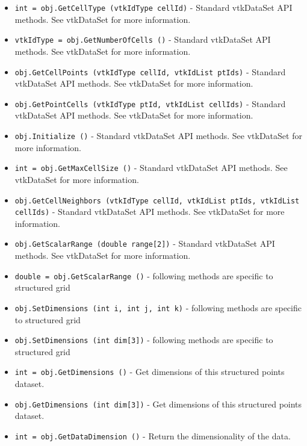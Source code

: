 \begin{itemize}
\item  \verb|int = obj.GetCellType (vtkIdType cellId)| -  Standard vtkDataSet API methods. See vtkDataSet for more information.

\item  \verb|vtkIdType = obj.GetNumberOfCells ()| -  Standard vtkDataSet API methods. See vtkDataSet for more information.

\item  \verb|obj.GetCellPoints (vtkIdType cellId, vtkIdList ptIds)| -  Standard vtkDataSet API methods. See vtkDataSet for more information.

\item  \verb|obj.GetPointCells (vtkIdType ptId, vtkIdList cellIds)| -  Standard vtkDataSet API methods. See vtkDataSet for more information.

\item  \verb|obj.Initialize ()| -  Standard vtkDataSet API methods. See vtkDataSet for more information.

\item  \verb|int = obj.GetMaxCellSize ()| -  Standard vtkDataSet API methods. See vtkDataSet for more information.

\item  \verb|obj.GetCellNeighbors (vtkIdType cellId, vtkIdList ptIds, vtkIdList cellIds)| -  Standard vtkDataSet API methods. See vtkDataSet for more information.

\item  \verb|obj.GetScalarRange (double range[2])| -  Standard vtkDataSet API methods. See vtkDataSet for more information.

\item  \verb|double = obj.GetScalarRange ()| -  following methods are specific to structured grid

\item  \verb|obj.SetDimensions (int i, int j, int k)| -  following methods are specific to structured grid

\item  \verb|obj.SetDimensions (int dim[3])| -  following methods are specific to structured grid

\item  \verb|int = obj.GetDimensions ()| -  Get dimensions of this structured points dataset.

\item  \verb|obj.GetDimensions (int dim[3])| -  Get dimensions of this structured points dataset.

\item  \verb|int = obj.GetDataDimension ()| -  Return the dimensionality of the data.


\end{itemize}

